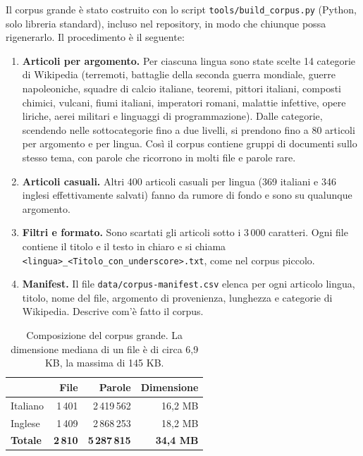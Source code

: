 \documentclass[11pt,a4paper]{article}
\newcommand{\code}[1]{\texttt{#1}}
\begin{document}
Il corpus grande è stato costruito con lo script \code{tools/build\_corpus.py}
(Python, solo libreria standard), incluso nel repository, in modo che chiunque possa
rigenerarlo. Il procedimento è il seguente:
\begin{enumerate}
  \item \textbf{Articoli per argomento.} Per ciascuna lingua sono state scelte 14
        categorie di Wikipedia (terremoti, battaglie della seconda guerra mondiale,
        guerre napoleoniche, squadre di calcio italiane, teoremi, pittori italiani,
        composti chimici, vulcani, fiumi italiani, imperatori romani, malattie
        infettive, opere liriche, aerei militari e linguaggi di programmazione). Dalle
        categorie, scendendo nelle sottocategorie fino a due livelli, si prendono fino
        a 80 articoli per argomento e per lingua. Così il corpus contiene gruppi di
        documenti sullo stesso tema, con parole che ricorrono in molti file e parole
        rare.
  \item \textbf{Articoli casuali.} Altri 400 articoli casuali per lingua (369 italiani
        e 346 inglesi effettivamente salvati) fanno da rumore di fondo e sono su
        qualunque argomento.
  \item \textbf{Filtri e formato.} Sono scartati gli articoli sotto i 3\,000 caratteri.
        Ogni file contiene il titolo e il testo in chiaro e si chiama
        \code{<lingua>\_<Titolo\_con\_underscore>.txt}, come nel corpus piccolo.
  \item \textbf{Manifest.} Il file \code{data/corpus-manifest.csv} elenca per ogni
        articolo lingua, titolo, nome del file, argomento di provenienza, lunghezza e
        categorie di Wikipedia. Descrive com'è fatto il corpus.
\end{enumerate}

\begin{table}[!htbp]
\centering
\begin{tabular}{@{}lrrr@{}}
\toprule
& \textbf{File} & \textbf{Parole} & \textbf{Dimensione} \\
\midrule
Italiano & 1\,401 & 2\,419\,562 & 16,2 MB \\
Inglese  & 1\,409 & 2\,868\,253 & 18,2 MB \\
\midrule
\textbf{Totale} & \textbf{2\,810} & \textbf{5\,287\,815} & \textbf{34,4 MB} \\
\bottomrule
\end{tabular}
\caption{Composizione del corpus grande. La dimensione mediana di un file è di circa
6,9 KB, la massima di 145 KB.}
\label{tab:dataset-grande}
\end{table}
\end{document}
